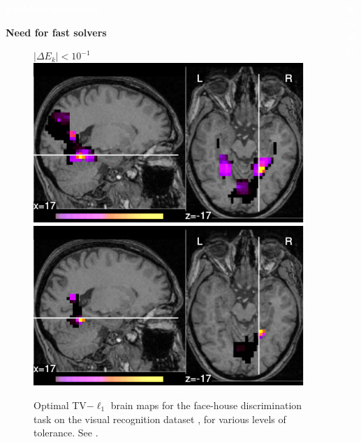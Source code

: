 \documentclass[french]{STIC_poster}
\begin{document}
\begin{frame}[t]
\begin{columns}[t]
\begin{column}{.48\linewidth}
\begin{abox}{\textbf{\textcolor{white}{Problem statement}}}
\begin{nbox}[\textwidth]{\textbf{Need for fast solvers}}
\begin{itemize}
\begin{figure}
{{{                                          $|\Delta E_k| < 10^{-1}$}}\hspace*{.32\linewidth}}\hfill%
                                    \includegraphics[width=.32\linewidth]{maps/face_vs_house_tol_0_001.pdf}%
                                    \hfill%
                                    \includegraphics[width=.32\linewidth]{maps/face_vs_house_tol_1e-05.pdf}%
                                    \caption{Optimal TV$-\ell_1$ brain maps for the face-house discrimination task on
                                      the visual recognition dataset \textcolor{cyan}{\cite{haxby2001}}, for various levels of tolerance. See \textcolor{cyan}{\cite{dohmatob2014benchmarking}}.}%
                                    \label{fig:maps_tolerance}
                                  \end{figure}
                                  \end{itemize}
                                \end{nbox}
				\end{abox}
			\end{column}
			\hfill
			\begin{column}{.48\linewidth}
			  \begin{abox}{\textbf{\textcolor{white}{Results}}}

\end{abox}
\end{column}
\end{columns}
\end{frame}
\end{document}
